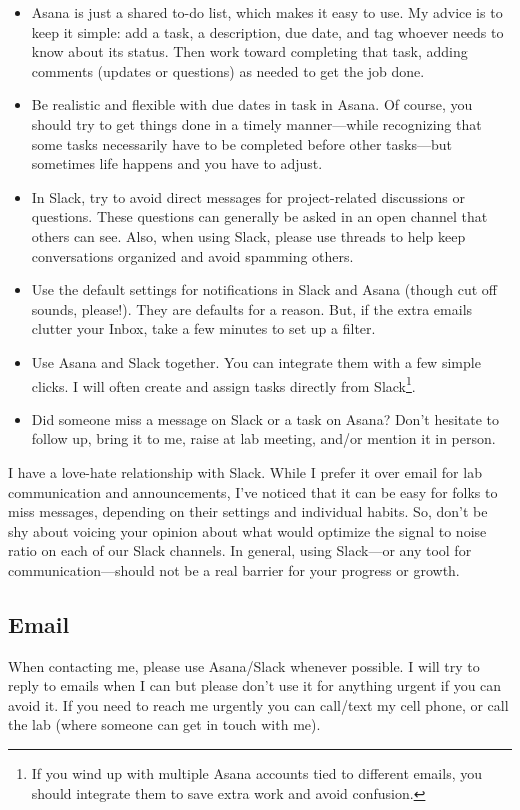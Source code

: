 \documentclass[letterpaper,11pt,oneside]{memoir}
\begin{document}
\begin{itemize}
\item Asana is just a shared to-do list, which makes it easy to use. My advice is to keep it simple: add a task, a description, due date, and tag whoever needs to know about its status. Then work toward completing that task, adding comments (updates or questions) as needed to get the job done.
\item Be realistic and flexible with due dates in task in Asana. Of course, you should try to get things done in a timely manner---while recognizing that some tasks necessarily have to be completed before other tasks---but sometimes life happens and you have to adjust.
\item In Slack, try to avoid direct messages for project-related discussions or questions. These questions can generally be asked in an open channel that others can see. Also, when using Slack, please use threads to help keep conversations organized and avoid spamming others.
\item Use the default settings for notifications in Slack and Asana (though cut off sounds, please!). They are defaults for a reason. But, if the extra emails clutter your Inbox, take a few minutes to set up a filter.
\item Use Asana and Slack together. You can integrate them with a few simple clicks. I will often create and assign tasks directly from Slack\footnote{If you wind up with multiple Asana accounts tied to different emails, you should integrate them to save extra work and avoid confusion.}.
\item Did someone miss a message on Slack or a task on Asana? Don't hesitate to follow up, bring it to me, raise at lab meeting, and/or mention it in person.
\end{itemize}

\begin{shaded}
\noindent I have a love-hate relationship with Slack. While I prefer it over email for lab communication and announcements, I've noticed that it can be easy for folks to miss messages, depending on their settings and individual habits. So, don't be shy about voicing your opinion about what would optimize the signal to noise ratio on each of our Slack channels. In general, using Slack---or any tool for communication---should not be a real barrier for your progress or growth.
\end{shaded}

\subsection{Email}
When contacting me, please use Asana/Slack whenever possible. I will try to reply to emails when I can but please don't use it for anything urgent if you can avoid it. If you need to reach me urgently you can call/text my cell phone, or call the lab (where someone can get in touch with me). 
\end{document}
